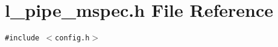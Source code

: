\section{l\_\-pipe\_\-mspec.h File Reference}
\label{l__pipe__mspec_8h}
{\tt \#include $<$config.h$>$}\par
